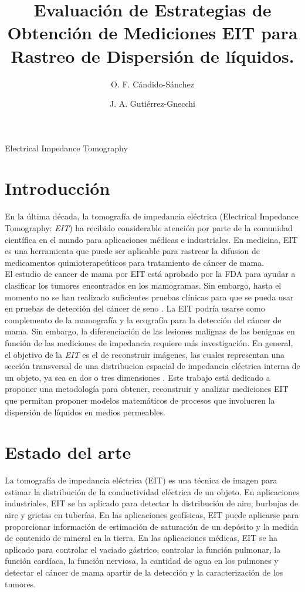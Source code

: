 \documentclass{IEEEtran}
\title{Evaluación de Estrategias de Obtención de Mediciones EIT para Rastreo de Dispersión de líquidos. }
\author[1]{O. F. Cándido-Sánchez}
\author[1]{J. A. Gutiérrez-Gnecchi}
\affil[1]{Departamento de Ingeniería Electrónica, Instituto Tecnológico de Morelia}
\begin{document}
  \maketitle
  \begin{abstract}
  \end{abstract}
  \begin{IEEEkeywords}
      Electrical Impedance Tomography
  \end{IEEEkeywords}

  \section{Introducción}
En la última década, la tomografía de impedancia eléctrica (Electrical Impedance Tomography: \textit{EIT}) ha recibido considerable atención por parte de la comunidad científica en el mundo para aplicaciones médicas e industriales. En medicina, EIT es una herramienta que puede ser aplicable para rastrear la difusion de medicamentos quimioterapeúticos para tratamiento de cáncer de mama\cite{Gnecchi2018}.\\
El estudio de cancer de mama por EIT está aprobado por la FDA para ayudar a clasificar los tumores encontrados en los mamogramas. Sin embargo, hasta el momento no se han realizado suficientes pruebas clínicas para que se pueda usar en pruebas de detección del cáncer de seno \cite{Cancer.org}. La EIT podría usarse como complemento de la mamografía y la ecografía para la detección del cáncer de mama. Sin embargo, la diferenciación de las lesiones malignas de las benignas en función de las mediciones de impedancia requiere más investigación\cite{Zou2003}.
En general, el objetivo de la \textit{EIT} es el de reconstruir imágenes, las cuales representan una sección transversal de una distribucion espacial de impedancia eléctrica interna de un objeto, ya sea en dos o tres dimensiones \cite{Mendoza2012}.
Este trabajo está dedicado a proponer una metodología para obtener, reconstruir y analizar mediciones EIT que permitan proponer modelos matemáticos de procesos que involucren la dispersión de líquidos en medios permeables.
\section{Estado del arte}
La tomografía de impedancia eléctrica (EIT) es una técnica de imagen para estimar la distribución de la conductividad eléctrica de un objeto. En aplicaciones industriales, EIT se ha aplicado para detectar la distribución de aire, burbujas de aire y grietas en tuberías. En las aplicaciones geofísicas, EIT puede aplicarse para proporcionar información de estimación de saturación de un depósito y la medida de contenido de mineral en la tierra.
En las aplicaciones médicas, EIT se ha aplicado para controlar el vaciado gástrico, controlar la función pulmonar, la función cardíaca, la función nerviosa, la cantidad de agua en los pulmones y detectar el cáncer de mama apartir de la detección y la caracterización de los tumores.
\end{document}
